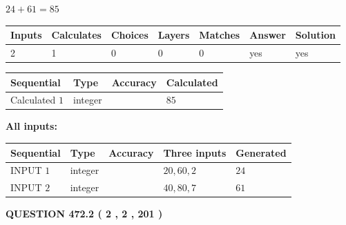\documentclass[12pt]{article}
\begin{document}
 

$ %
24 +  %
61=   %
85$
 
 
\noindent{}
 
 

 
   
   
   
   
\noindent\begin{tabular}{|l|l|l|l|l|l|l|}
 \hline
Inputs & Calculates & Choices & Layers & Matches & Answer & Solution \\ \hline
 2  & 
 1  & 
 0
  & 
 0  & 
 0  & 
  yes & 
  yes 
  \\ \hline
 \end{tabular}
   
   
   
   
\noindent{}
   
   
  
  
\noindent\begin{tabular}{|l|l|l|l|}
\hline
 Sequential & Type & Accuracy & Calculated \\ 
\hline
 
 
  Calculated $  1 $ & integer &  & 
  $ 85 $ 
 \\  \hline  
 \end{tabular}
   
   
   
   
\noindent\vspace{0.1in}\hspace{-0.08in} {\textbf{\Large{All inputs: }}}
   
   
  
  
\noindent\begin{tabular}{|l|l|l|l|l|}
\hline
 Sequential & Type & Accuracy & Three inputs & Generated \\ 
\hline
 
 
  INPUT $  1 $ & integer &  & $
 20
 , 
 60
 , 
 2
 $ & $ 24 $ 
 \\  \hline  
 
 
  INPUT $  2 $ & integer &  & $
 40
 , 
 80
 , 
 7
 $ & $ 61 $ 
 \\  \hline  
 \end{tabular}
   
   
  
\vspace{0.2in}
  
{\textbf{\Large{QUESTION
472.2 
 ( 2 , 2 , 201 )
}}}
  
\end{document}
